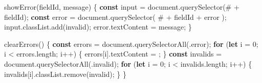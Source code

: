 \documentclass[11pt,a4paper,oneside]{book}
\newenvironment{Shaded}{\begin{snugshade}}{\end{snugshade}}
\newcommand{\KeywordTok}[1]{\textcolor[HTML]{007020}{\textbf{#1}}}
\newcommand{\DecValTok}[1]{\textcolor[HTML]{40A070}{#1}}
\newcommand{\StringTok}[1]{\textcolor[HTML]{4070A0}{#1}}
\newcommand{\FunctionTok}[1]{\textcolor[HTML]{06287E}{#1}}
\newcommand{\ControlFlowTok}[1]{\textcolor[HTML]{007020}{\textbf{#1}}}
\newcommand{\OperatorTok}[1]{\textcolor[HTML]{666666}{#1}}
\newcommand{\BuiltInTok}[1]{#1}
\newcommand{\AttributeTok}[1]{\textcolor[HTML]{7D9029}{#1}}
\newcommand{\NormalTok}[1]{#1}
\begin{document}
\begin{Shaded}
\begin{Highlighting}[]
\FunctionTok{showError}\NormalTok{(fieldId}\OperatorTok{,}\NormalTok{ message) \{}
    \KeywordTok{const}\NormalTok{ input }\OperatorTok{=} \BuiltInTok{document}\OperatorTok{.}\FunctionTok{querySelector}\NormalTok{(}\StringTok{\textquotesingle{}\#\textquotesingle{}} \OperatorTok{+}\NormalTok{ fieldId)}\OperatorTok{;}
    \KeywordTok{const}\NormalTok{ error }\OperatorTok{=} \BuiltInTok{document}\OperatorTok{.}\FunctionTok{querySelector}\NormalTok{(}
        \StringTok{\textquotesingle{}\#\textquotesingle{}} \OperatorTok{+}\NormalTok{ fieldId }\OperatorTok{+} \StringTok{\textquotesingle{}{-}error\textquotesingle{}}
\NormalTok{    )}\OperatorTok{;}
\NormalTok{    input}\OperatorTok{.}\AttributeTok{classList}\OperatorTok{.}\FunctionTok{add}\NormalTok{(}\StringTok{\textquotesingle{}invalid\textquotesingle{}}\NormalTok{)}\OperatorTok{;}
\NormalTok{    error}\OperatorTok{.}\AttributeTok{textContent} \OperatorTok{=}\NormalTok{ message}\OperatorTok{;}
\NormalTok{\}}
\end{Highlighting}
\end{Shaded}

\begin{Shaded}
\begin{Highlighting}[]
\FunctionTok{clearErrors}\NormalTok{() \{}
    \KeywordTok{const}\NormalTok{ errors }\OperatorTok{=} \BuiltInTok{document}\OperatorTok{.}\FunctionTok{querySelectorAll}\NormalTok{(}\StringTok{\textquotesingle{}.error\textquotesingle{}}\NormalTok{)}\OperatorTok{;}
    \ControlFlowTok{for}\NormalTok{ (}\KeywordTok{let}\NormalTok{ i }\OperatorTok{=} \DecValTok{0}\OperatorTok{;}\NormalTok{ i }\OperatorTok{\textless{}}\NormalTok{ errors}\OperatorTok{.}\AttributeTok{length}\OperatorTok{;}\NormalTok{ i}\OperatorTok{++}\NormalTok{) \{}
\NormalTok{        errors[i]}\OperatorTok{.}\AttributeTok{textContent} \OperatorTok{=} \StringTok{\textquotesingle{}\textquotesingle{}}\OperatorTok{;}
\NormalTok{    \}}
    \KeywordTok{const}\NormalTok{ invalids }\OperatorTok{=} \BuiltInTok{document}\OperatorTok{.}\FunctionTok{querySelectorAll}\NormalTok{(}\StringTok{\textquotesingle{}.invalid\textquotesingle{}}\NormalTok{)}\OperatorTok{;}
    \ControlFlowTok{for}\NormalTok{ (}\KeywordTok{let}\NormalTok{ i }\OperatorTok{=} \DecValTok{0}\OperatorTok{;}\NormalTok{ i }\OperatorTok{\textless{}}\NormalTok{ invalids}\OperatorTok{.}\AttributeTok{length}\OperatorTok{;}\NormalTok{ i}\OperatorTok{++}\NormalTok{) \{}
\NormalTok{        invalids[i]}\OperatorTok{.}\AttributeTok{classList}\OperatorTok{.}\FunctionTok{remove}\NormalTok{(}\StringTok{\textquotesingle{}invalid\textquotesingle{}}\NormalTok{)}\OperatorTok{;}
\NormalTok{    \}}
\NormalTok{\}}
\end{Highlighting}
\end{Shaded}
\end{document}
